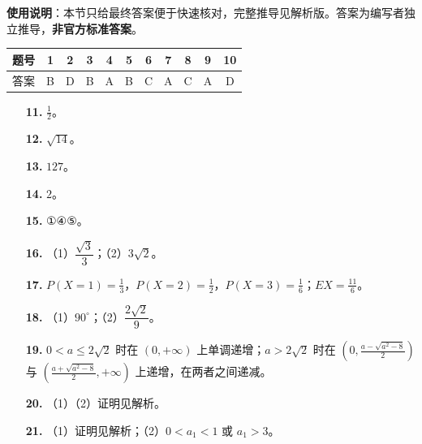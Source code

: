 
\begin{gknotice}
\textbf{使用说明}：本节只给最终答案便于快速核对，完整推导见解析版。答案为编写者独立推导，\textbf{非官方标准答案}。
\end{gknotice}

\begin{center}\begin{tabular}{ccccccccccc}
\toprule
题号 & 1 & 2 & 3 & 4 & 5 & 6 & 7 & 8 & 9 & 10 \\
\midrule
答案 & B & D & B & A & B & C & A & C & A & D \\
\bottomrule
\end{tabular}\end{center}

\begin{itemize}[leftmargin=2.6em]
  \item[\textbf{11.}] $\frac12$。
  \item[\textbf{12.}] $\sqrt{14}$。
  \item[\textbf{13.}] $127$。
  \item[\textbf{14.}] $2$。
  \item[\textbf{15.}] ①④⑤。
\end{itemize}

\begin{itemize}[leftmargin=2.6em]
  \item[\textbf{16.}] （1）$\dfrac{\sqrt3}{3}$；（2）$3\sqrt2$。
  \item[\textbf{17.}] $P(X=1)=\frac13$，$P(X=2)=\frac12$，$P(X=3)=\frac16$；$EX=\frac{11}{6}$。
  \item[\textbf{18.}] （1）$90^\circ$；（2）$\dfrac{2\sqrt2}{9}$。
  \item[\textbf{19.}] $0<a\leqslant2\sqrt2$ 时在 $(0,+\infty)$ 上单调递增；$a>2\sqrt2$ 时在 $\left(0,\frac{a-\sqrt{a^2-8}}2\right)$ 与 $\left(\frac{a+\sqrt{a^2-8}}2,+\infty\right)$ 上递增，在两者之间递减。
  \item[\textbf{20.}] （1）（2）证明见解析。
  \item[\textbf{21.}] （1）证明见解析；（2）$0<a_1<1$ 或 $a_1>3$。
\end{itemize}
